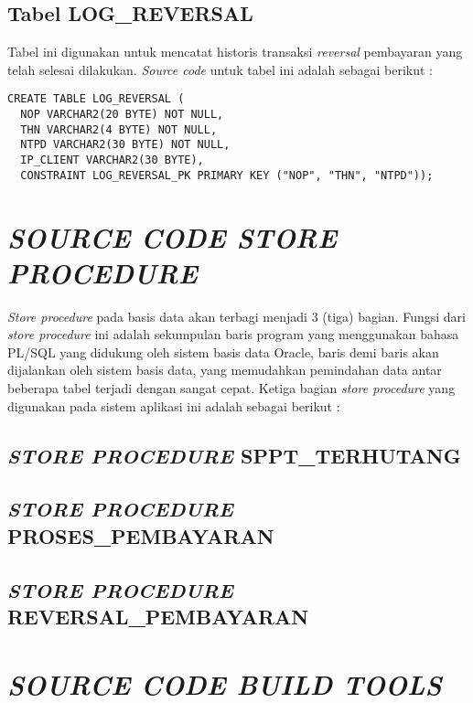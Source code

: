 \documentclass[pdftex,12pt, oneside]{article}
\begin{document}
  \subsection{Tabel LOG\_REVERSAL}
  
  Tabel ini digunakan untuk mencatat historis transaksi \textit{reversal} pembayaran yang telah selesai dilakukan. \textit{Source code} untuk tabel ini adalah sebagai berikut :
  
  \begin{lstlisting}
CREATE TABLE LOG_REVERSAL (	
  NOP VARCHAR2(20 BYTE) NOT NULL,
  THN VARCHAR2(4 BYTE) NOT NULL,
  NTPD VARCHAR2(30 BYTE) NOT NULL,
  IP_CLIENT VARCHAR2(30 BYTE),
  CONSTRAINT LOG_REVERSAL_PK PRIMARY KEY ("NOP", "THN", "NTPD"));    
  \end{lstlisting}


\section{\textit{SOURCE CODE STORE PROCEDURE}}

\textit{Store procedure} pada basis data akan terbagi menjadi 3 (tiga) bagian. Fungsi dari \textit{store procedure} ini adalah sekumpulan baris program yang menggunakan bahasa PL/SQL yang didukung oleh sistem basis data Oracle, baris demi baris akan dijalankan oleh sistem basis data, yang memudahkan pemindahan data antar beberapa tabel terjadi dengan sangat cepat. Ketiga bagian \textit{store procedure} yang digunakan pada sistem aplikasi ini adalah sebagai berikut :

\subsection{\textit{STORE PROCEDURE} SPPT\_TERHUTANG}



\subsection{\textit{STORE PROCEDURE} PROSES\_PEMBAYARAN}

\subsection{\textit{STORE PROCEDURE} REVERSAL\_PEMBAYARAN}


\section{\textit{SOURCE CODE BUILD TOOLS}}
\end{document}

